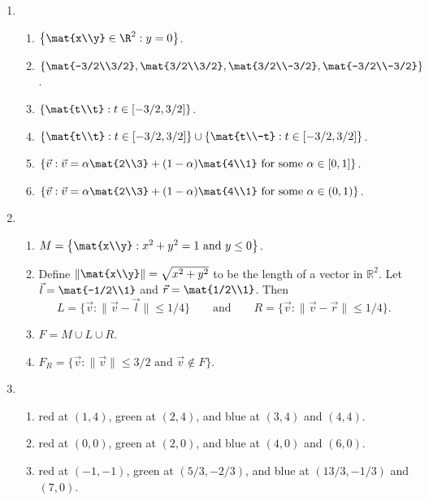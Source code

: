 
		\begin{enumerate}
			\item \begin{enumerate}
					\item $\left\{\mat{x\\y}\in\R^2:y=0\right\}$.
					\item $\left\{\mat{-3/2\\3/2},\mat{3/2\\3/2},\mat{3/2\\-3/2},\mat{-3/2\\-3/2}
							\right\}$.
					\item $\left\{\mat{t\\t}:t\in[-3/2,3/2]\right\}$.
					\item $\left\{\mat{t\\t}:t\in[-3/2,3/2]\right\}\cup \left\{\mat{t\\-t}:t\in[-3/2,3/2]\right\}$.
					\item $\left\{\vec v: \vec v=\alpha \mat{2\\3}+(1-\alpha)\mat{4\\1}\text{ for some }\alpha\in[0,1]\right\}$.
					\item $\left\{\vec v: \vec v=\alpha \mat{2\\3}+(1-\alpha)\mat{4\\1}\text{ for some }\alpha\in(0,1)\right\}$.
			\end{enumerate}
			\item \begin{enumerate}
					\item $M=
						\left\{\mat{x\\y}: x^2+y^2 = 1\text{ and }y\leq 0\right\}$.
					\item Define $\left\|\mat{x\\y}\right\|=\sqrt{x^2+y^2}$ to
						be the length of a vector in $\mathbb R^2$.
						Let $\vec l=\mat{-1/2\\1}$ and $\vec r=\mat{1/2\\1}$. Then \[L=\{\vec v:\|\vec v-\vec l\|\leq 1/4\}
						\qquad\text{and}\qquad R=\{\vec v:\|\vec v-\vec r\|\leq 1/4\}.\]
					\item $F=M\cup L\cup R$.
					\item $F_R=\{\vec v:\|\vec v\| \leq 3/2\text{ and }\vec v\notin F\}$.
			\end{enumerate}
			\item \begin{enumerate}
				\item red at $(1,4)$, green at $(2,4)$, and blue at $(3,4)$ and $(4,4)$.
				\item red at $(0,0)$, green at $(2,0)$, and blue at $(4,0)$ and $(6,0)$.
				\item red at $(-1,-1)$, green at $(5/3,-2/3)$, and blue at $(13/3,-1/3)$ and $(7,0)$.
			\end{enumerate}
		\end{enumerate}